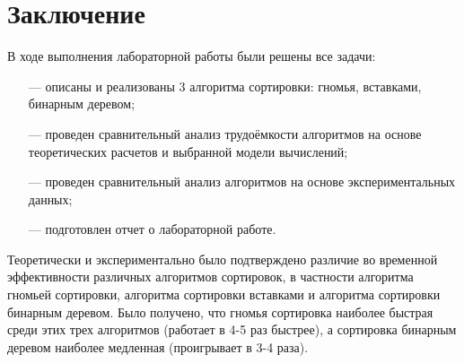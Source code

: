 \chapter*{Заключение}

В ходе выполнения лабораторной работы были решены все задачи:

\begin{itemize}
	\item[---] описаны и реализованы 3 алгоритма сортировки: гномья, вставками, бинарным деревом;
	\item[---] проведен сравнительный анализ трудоёмкости алгоритмов на основе теоретических расчетов и выбранной модели вычислений;
	\item[---] проведен сравнительный анализ алгоритмов на основе экспериментальных данных;
	\item[---] подготовлен отчет о лабораторной работе.
\end{itemize}

Теоретически и экспериментально было подтверждено различие во временной эффективности различных алгоритмов сортировок, в частности алгоритма гномьей сортировки, алгоритма сортировки вставками и алгоритма сортировки бинарным деревом.  Было получено, что гномья сортировка наиболее быстрая среди этих трех алгоритмов (работает в 4-5 раз быстрее), а сортировка бинарным деревом наиболее медленная (проигрывает в 3-4 раза).

